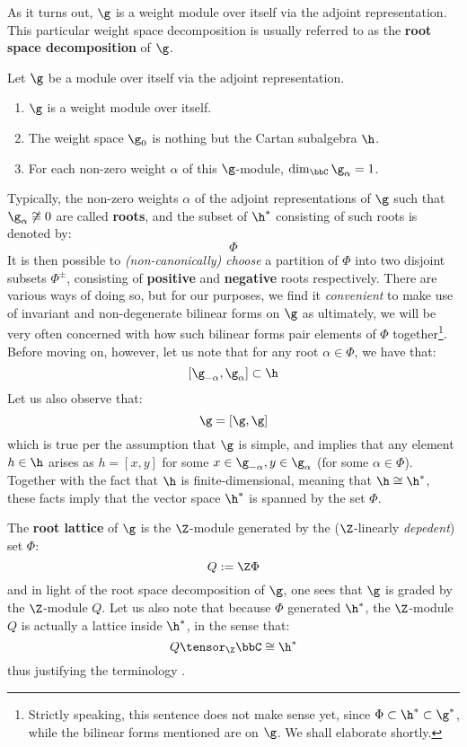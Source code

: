         As it turns out, $\g$ is a weight module over itself via the adjoint representation. This particular weight space decomposition is usually referred to as the \textbf{root space decomposition} of $\g$. 
        \begin{theorem} \label{theorem: root_space_decomposition_for_finite_dimensional_simple_lie_algebras}
            Let $\g$ be a module over itself via the adjoint representation.
            \begin{enumerate}
                \item $\g$ is a weight module over itself.
                \item The weight space $\g_0$ is nothing but the Cartan subalgebra $\h$.
                \item For each non-zero weight $\alpha$ of this $\g$-module, $\dim_{\bbC} \g_{\alpha} = 1$.
            \end{enumerate}
        \end{theorem}
        Typically, the non-zero weights $\alpha$ of the adjoint representations of $\g$ such that $\g_{\alpha} \not \cong 0$ are called \textbf{roots}, and the subset of $\h^*$ consisting of such roots is denoted by:
            $$\Phi$$
        It is then possible to \textit{(non-canonically) choose} a partition of $\Phi$ into two disjoint subsets $\Phi^{\pm}$, consisting of \textbf{positive} and \textbf{negative} roots respectively. There are various ways of doing so, but for our purposes, we find it \textit{convenient} to make use of invariant and non-degenerate bilinear forms on $\g$ as ultimately, we will be very often concerned with how such bilinear forms pair elements of $\Phi$ together\footnote{Strictly speaking, this sentence does not make sense yet, since $\Phi \subset \h^* \subset \g^*$, while the bilinear forms mentioned are on $\g$. We shall elaborate shortly.}. Before moving on, however, let us note that for any root $\alpha \in \Phi$, we have that:
            $$[\g_{-\alpha}, \g_{\alpha}] \subset \h$$
        Let us also observe that:
            $$\g = [\g, \g]$$
        which is true per the assumption that $\g$ is simple, and implies that any element $h \in \h$ arises as $h = [x, y]$ for some $x \in \g_{-\alpha}, y \in \g_{\alpha}$ (for some $\alpha \in \Phi$). Together with the fact that $\h$ is finite-dimensional, meaning that $\h \cong \h^*$, these facts imply that the vector space $\h^*$ is spanned by the set $\Phi$.

        The \textbf{root lattice} of $\g$ is the $\Z$-module generated by the ($\Z$-linearly \textit{depedent}) set $\Phi$:
            $$Q := \Z \Phi$$
        and in light of the root space decomposition of $\g$, one sees that $\g$ is graded by the $\Z$-module $Q$. Let us also note that because $\Phi$ generated $\h^*$, the $\Z$-module $Q$ is actually a lattice inside $\h^*$, in the sense that:
            $$Q \tensor_{\Z} \bbC \cong \h^*$$
        thus justifying the terminology .

